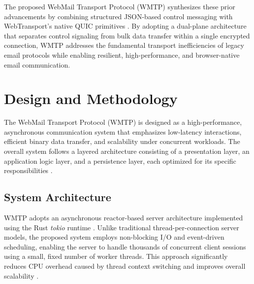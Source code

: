 \documentclass[10pt,a4paper]{article}
\begin{document}
The proposed WebMail Transport Protocol (WMTP) synthesizes these prior advancements by combining structured JSON-based control messaging with WebTransport’s native QUIC primitives \cite{quic,webtransport,jmap}. By adopting a dual-plane architecture that separates control signaling from bulk data transfer within a single encrypted connection, WMTP addresses the fundamental transport inefficiencies of legacy email protocols while enabling resilient, high-performance, and browser-native email communication.
\vspace{12pt}
\section{Design and Methodology}

The WebMail Transport Protocol (WMTP) is designed as a
high-performance, asynchronous communication system that
emphasizes low-latency interactions, efficient binary data
transfer, and scalability under concurrent workloads. The
overall system follows a layered architecture consisting of a
presentation layer, an application logic layer, and a persistence
layer, each optimized for its specific responsibilities
\cite{rustasync, mongodb2024}.

\subsection{System Architecture}

WMTP adopts an asynchronous reactor-based server
architecture implemented using the Rust \textit{tokio} runtime
\cite{rustasync}. Unlike traditional thread-per-connection
server models, the proposed system employs non-blocking I/O
and event-driven scheduling, enabling the server to handle
thousands of concurrent client sessions using a small, fixed
number of worker threads. This approach significantly reduces
CPU overhead caused by thread context switching and improves
overall scalability \cite{rustasync}.
\end{document}
